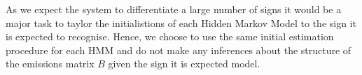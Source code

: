 As we expect the system to differentiate a large number of signs it would be a major task to taylor the initialistions of each Hidden Markov Model to the sign it is expected to recognise. Hence, we choose to use the same initial estimation procedure for each HMM and do not make any inferences about the structure of the emissions matrix $B$ given the sign it is expected model.

